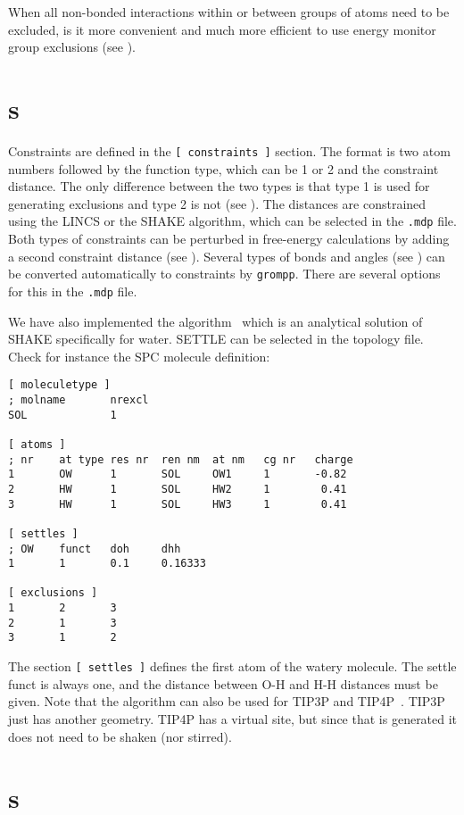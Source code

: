 When all non-bonded interactions within or between groups of atoms need
to be excluded, is it more convenient and much more efficient to use
energy monitor group exclusions (see ).

\section{s}
\label{sec:constraints}
Constraints are defined in the {\tt [~constraints~]} section.
The format is two atom numbers followed by the function type,
which can be 1 or 2 and the constraint distance.
The only difference between the two types is that type 1 is used
for generating exclusions and type 2 is not (see ).
The distances are constrained using the LINCS or the SHAKE algorithm,
which can be selected in the {\tt *.mdp} file.
Both types of constraints can be perturbed in free-energy calculations
by adding a second constraint distance (see ).
Several types of bonds and angles (see ) can
be converted automatically to constraints by {\tt grompp}.
There are several options for this in the {\tt *.mdp} file.

We have also implemented the  algorithm~\cite{Miyamoto92}
which is an analytical solution of SHAKE specifically for water. 
SETTLE can be selected in the topology file. Check for instance the
SPC molecule definition:
\begin{verbatim}
[ moleculetype ]
; molname       nrexcl
SOL             1

[ atoms ]
; nr    at type res nr  ren nm  at nm   cg nr   charge
1       OW      1       SOL     OW1     1       -0.82
2       HW      1       SOL     HW2     1        0.41
3       HW      1       SOL     HW3     1        0.41

[ settles ]
; OW    funct   doh     dhh
1       1       0.1     0.16333

[ exclusions ]
1       2       3
2       1       3
3       1       2
\end{verbatim}
The section {\tt [ settles ]} defines the first atom of the watery molecule.
The settle funct is always one, and the distance between O-H and H-H distances
must be given. Note that the algorithm can also be used
for TIP3P and TIP4P~\cite{Jorgensen83}.
TIP3P just has another geometry. TIP4P has a virtual site, but since 
that is generated it does not need to be shaken (nor stirred).

\section{s}

